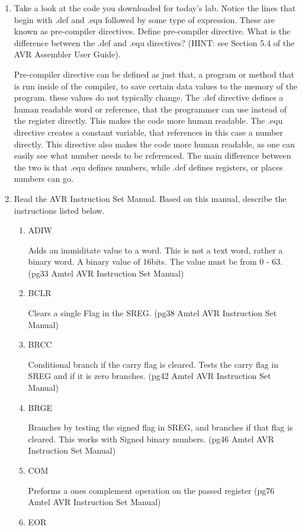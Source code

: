 \documentclass[12pt,letterpaper]{article}
\begin{document}
\begin{enumerate}
    \item
    Take a look at the code you downloaded for today’s lab. Notice the lines that begin with .def and .equ followed by some type of expression. These are known as pre-compiler directives. Define pre-compiler directive. What is the difference between the .def and .equ directives? (HINT: see Section 5.4 of the AVR Assembler User Guide).

    Pre-compiler directive can be defined as just that, a program or method that is run inside of the compiler, to save certain data values to the memory of the program. these values do not typically change. The .def directive defines a human readable word or reference, that the programmer can use instead of the register directly. This makes the code more human readable. The .equ directive creates a constant variable, that references in this case a number directly. This directive also makes the code more human readable, as one can easily see what number needs to be referenced. The main difference between the two is that .equ defines numbers, while .def defines registers, or places numbers can go.

	\item 
	Read the AVR Instruction Set Manual. Based on this manual, describe the instructions listed below.
	\begin{enumerate}
		\item ADIW
		
		Adds an immiditate value to a word. This is not a text word, rather a binary word. A binary value of 16bits. The value must be from 0 - 63. (pg33 Amtel AVR Instruction Set Manual)
		\item BCLR
		
		Clears a single Flag in the SREG. (pg38 Amtel AVR Instruction Set Manual)
		\item BRCC
		
		Conditional branch if the carry flag is cleared. Tests the carry flag in SREG and if it is zero branches. (pg42 Amtel AVR Instruction Set Manual)
		\item BRGE
		
		Branches by testing the signed flag in SREG, and branches if that flag is cleared. This works with Signed binary numbers. (pg46 Amtel AVR Instruction Set Manual)
		\item COM
		
		Preforms a ones complement operation on the passed register (pg76 Amtel AVR Instruction Set Manual)
		\item EOR
		

\end{enumerate}
\end{enumerate}
\end{document}

